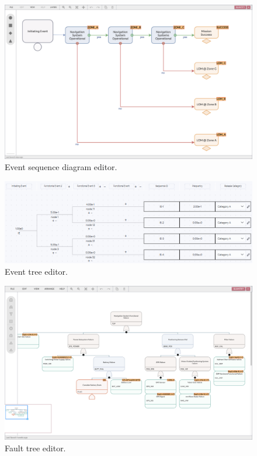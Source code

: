 \begin{figure}
  \centering
  \includegraphics[width=\textwidth]{4_proposed_solution/web_app/figures/esd.png}
  \caption{Event sequence diagram editor.}
  \label{fig:esd_editor}
\end{figure}

\begin{figure}
  \centering
  \includegraphics[width=\textwidth]{4_proposed_solution/web_app/figures/et.png}
  \caption{Event tree editor.}
  \label{fig:et_editor}
\end{figure}

\begin{figure}
  \centering
  \includegraphics[width=\textwidth]{4_proposed_solution/web_app/figures/ft.png}
  \caption{Fault tree editor.}
  \label{fig:ft_editor}
\end{figure}

